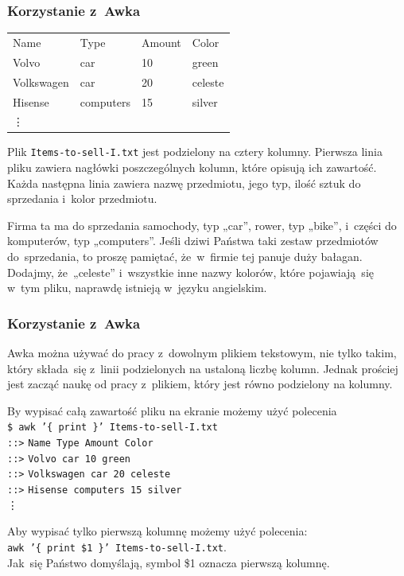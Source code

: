 \documentclass[10pt,t]{beamer}
\begin{document}
\begin{frame}
  \frametitle{Korzystanie z~Awka}


  \begin{tabular}{l l l l}
    Name & Type & Amount & Color \\
    Volvo & car & 10 & green \\
    Volkswagen & car & 20 & celeste \\
    Hisense & computers & 15 & silver \\
    \hspace{2em} \vdots & & &
  \end{tabular}

  Plik \texttt{Items-to-sell-I.txt} jest podzielony na cztery kolumny.
  Pierwsza linia pliku zawiera nagłówki poszczególnych kolumn, które
  opisują ich zawartość. Każda następna linia zawiera nazwę przedmiotu,
  jego typ, ilość sztuk do sprzedania i~kolor przedmiotu.

  Firma ta ma do sprzedania samochody, typ „car”, rower, typ „bike”,
  i~części do komputerów, typ „computers”. Jeśli dziwi Państwa taki
  zestaw przedmiotów do~sprzedania, to proszę pamiętać, że~w~firmie tej
  panuje duży bałagan. Dodajmy, że~„celeste” i~wszystkie inne nazwy
  kolorów, które pojawiają~się w~tym pliku, naprawdę istnieją w~języku
  angielskim.

\end{frame}





\begin{frame}
  \frametitle{Korzystanie z~Awka}


  Awka można używać do pracy z~dowolnym plikiem tekstowym, nie tylko
  takim, który składa~się z~linii podzielonych na ustaloną liczbę kolumn.
  Jednak prościej jest zacząć naukę od pracy z~plikiem, który jest równo
  podzielony na kolumny.

  By wypisać całą zawartość pliku na ekranie możemy użyć polecenia \\
  \texttt{\$ awk '\{ print \}' Items-to-sell-I.txt} \\
  \texttt{::>} \texttt{Name Type Amount Color} \\
  \texttt{::>} \texttt{Volvo car 10 green} \\
  \texttt{::>} \texttt{Volkswagen car 20 celeste} \\
  \texttt{::>} \texttt{Hisense computers 15 silver} \\
  \hspace{3em} \vdots

  Aby wypisać tylko pierwszą kolumnę możemy użyć polecenia: \\
  \texttt{awk '\{ print \$1 \}' Items-to-sell-I.txt}. \\
  Jak~się Państwo domyślają, symbol \$1 oznacza pierwszą kolumnę.

\end{frame}
\end{document}
